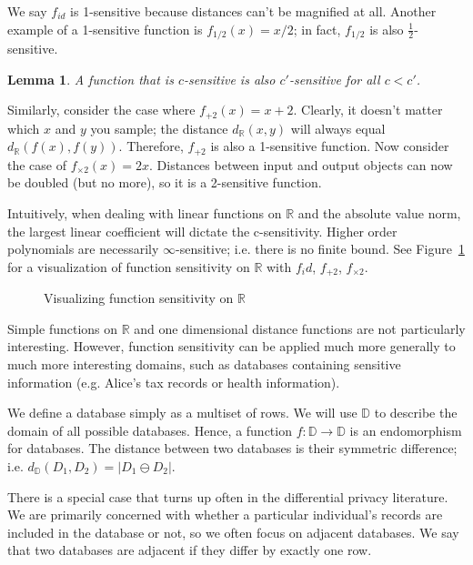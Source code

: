 \documentclass[12pt]{report}
\newtheorem{lem}[defn]{Lemma}
\begin{document}
We say $f_{id}$ is 1-sensitive because distances can't be magnified at all.
Another example of a 1-sensitive function is $f_{1/2}(x) = x/2$; in fact, $f_{1/2}$ is also $\frac{1}{2}$-sensitive.

\begin{lem}\label{lem:clessthancprime}
  A function that is $c$-sensitive is also $c'$-sensitive for all $c < c'$.
\end{lem}

Similarly, consider the case where $f_{+2}(x) = x + 2$.
Clearly, it doesn't matter which $x$ and $y$ you sample; the distance $d_{\mathbb R}(x,y)$ will always equal $d_{\mathbb R}(f(x),f(y))$.
Therefore, $f_{+2}$ is also a 1-sensitive function.
Now consider the case of $f_{\times 2}(x) = 2x$.
Distances between input and output objects can now be doubled (but no more), so it is a 2-sensitive function.

Intuitively, when dealing with linear functions on $\mathbb R$ and the absolute value norm, the largest linear coefficient will dictate the c-sensitivity.
Higher order polynomials are necessarily $\infty$-sensitive; i.e. there is no finite bound.
See Figure~\ref{fig:fn_sens} for a visualization of function sensitivity on $\mathbb R$ with $f_id$, $f_{+2}$, $f_{\times 2}$.

\begin{figure}
    \centering
    \def\svgwidth{0.5\columnwidth}
    
    \caption{Visualizing function sensitivity on $\mathbb{R}$}
    \label{fig:fn_sens}
\end{figure}

Simple functions on $\mathbb R$ and one dimensional distance functions are not particularly interesting.
However, function sensitivity can be applied much more generally to much more interesting domains, such as databases containing sensitive information (e.g. Alice's tax records or health information).

We define a database simply as a multiset of rows.
We will use $\mathbb D$ to describe the domain of all possible databases.
Hence, a function $f : \mathbb D \rightarrow \mathbb D$ is an endomorphism for databases.
The distance between two databases is their symmetric difference; i.e. $d_{\mathbb D}(D_1,D_2) = | D_1 \ominus D_2 |$.

There is a special case that turns up often in the differential privacy literature.
We are primarily concerned with whether a particular individual's records are included in the database or not, so we often focus on adjacent databases.
We say that two databases are adjacent if they differ by exactly one row.
\end{document}
